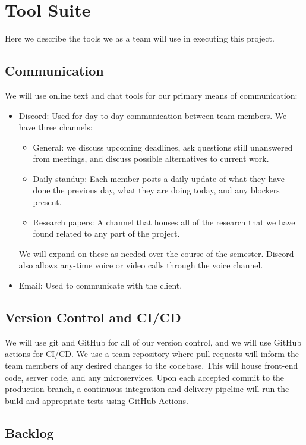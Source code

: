 \section{Tool Suite}

Here we describe the tools we as a team will use in executing this project.

\subsection{Communication}
We will use online text and chat tools for our primary means of communication:
\begin{itemize}
    \item Discord: Used for day-to-day communication between team members. We have three channels:
    \begin{itemize}
        \item General: we discuss upcoming deadlines, ask questions still unanswered from meetings, and discuss possible alternatives to current work.
        \item Daily standup: Each member posts a daily update of what they have done the previous day, what they are doing today, and any blockers present. 
        \item Research papers: A channel that houses all of the research that we have found related to any part of the project. 
    \end{itemize}
    We will expand on these as needed over the course of the semester. Discord also allows any-time voice or video calls through the voice channel.
    \item Email: Used to communicate with the client.
\end{itemize}

\subsection{Version Control and CI/CD}
We will use git and GitHub for all of our version control, and we will use GitHub actions for CI/CD. We use a team repository where pull requests will inform the team members of any desired changes to the codebase. This will house front-end code, server code, and any microservices. Upon each accepted commit to the production branch, a continuous integration and delivery pipeline will run the build and appropriate tests using GitHub Actions.

\subsection{Backlog}

